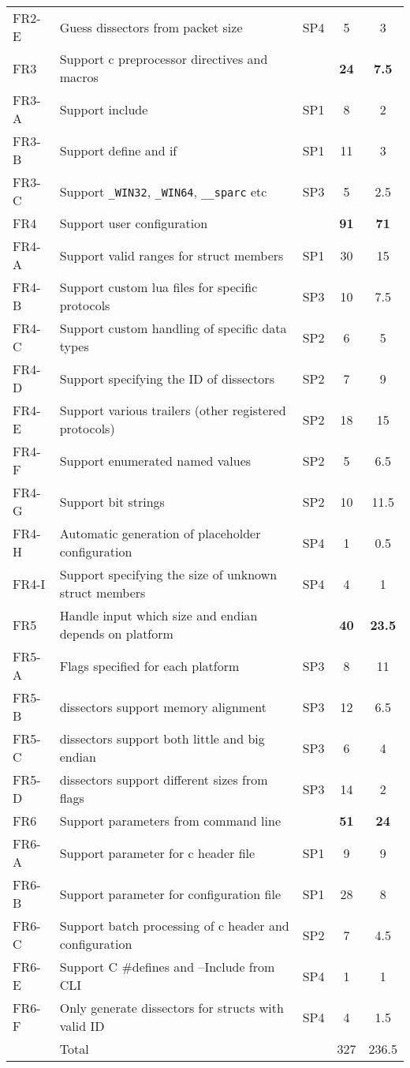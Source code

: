 \begin{table}[htbp]
{\begin{tabularx}{1.13\textwidth}{l X c c c}
	FR2-E & Guess \glspl{dissector} from packet size & SP4 & 5 & 3\\
    \addlinespace
	FR3 & Support \Gls{c} \gls{preprocessor} directives and macros & & \textbf{24} &  \textbf{7.5}\\
	FR3-A & Support \gls{include} & SP1 & 8 & 2 \\
	FR3-B & Support \gls{define} and \gls{if} & SP1 & 11 & 3 \\
	FR3-C & Support \verb+_WIN32+, \verb+_WIN64+, \verb+__sparc+ etc & SP3 & 5 & 2.5 \\
	\addlinespace
	FR4 & Support user configuration & & \textbf{91} & \textbf{71}\\
	FR4-A & Support valid ranges for \gls{struct} \glspl{member} & SP1 & 30 & 15 \\
	FR4-B & Support custom \Gls{lua} files for specific protocols & SP3 & 10 & 7.5 \\
	FR4-C & Support custom handling of specific data types & SP2 & 6 & 5 \\
	FR4-D & Support specifying the ID of \glspl{dissector} & SP2 & 7 & 9 \\
	FR4-E & Support various \gls{trailers} (other registered protocols) & SP2 & 18 & 15 \\
	FR4-F & Support \glspl{enumerated named value} & SP2 & 5 & 6.5 \\
	FR4-G & Support bit strings & SP2 & 10 & 11.5 \\
	FR4-H & Automatic generation of placeholder configuration & SP4 & 1 & 0.5\\
	FR4-I & Support specifying the size of unknown struct members & SP4 & 4 & 1\\
	\addlinespace
	FR5 & Handle input which size and \gls{endian} depends on platform & & \textbf{40} & \textbf{23.5} \\
	FR5-A & Flags specified for each platform & SP3 & 8 & 11 \\
	FR5-B & \Glspl{dissector} support memory alignment & SP3 & 12 & 6.5 \\
	FR5-C & \Glspl{dissector} support both little and big \gls{endian} & SP3 & 6 & 4 \\
	FR5-D & \Glspl{dissector} support different sizes from flags & SP3 & 14 & 2 \\	
    \addlinespace
	FR6 & Support parameters from command line & & \textbf{51} & \textbf{24}\\
	FR6-A & Support parameter for \Gls{c} \gls{header} file & SP1 & 9 & 9 \\
	FR6-B & Support parameter for configuration file & SP1 & 28 & 8 \\
	FR6-C & Support batch processing of \Gls{c} \gls{header} and configuration & SP2 & 7 & 4.5 \\
	FR6-E & Support C \#defines and --Include from CLI & SP4 & 1 & 1 \\
	FR6-F & Only generate dissectors for structs with valid ID & SP4 & 4 & 1.5 \\
	\midrule
	& Total & & 327 & 236.5 \\
    \bottomrule
\end{tabularx}}
\end{table}	

